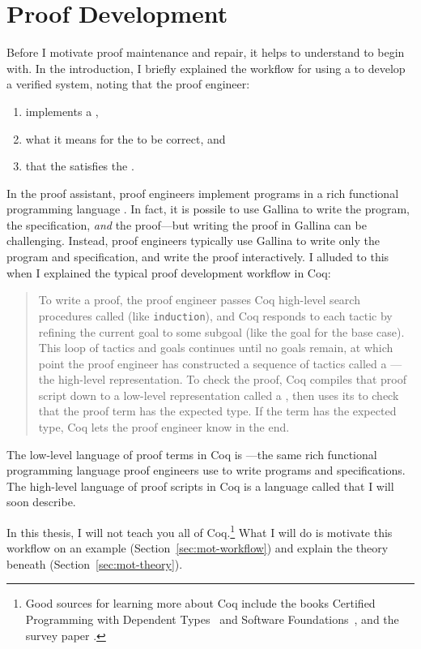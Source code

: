 \section{Proof Development}
\label{sec:mot-dev}

Before I motivate proof maintenance and repair, it helps to understand  to begin with.
In the introduction, I briefly explained the workflow for using a  to develop a verified system,
noting that the proof engineer:

\begin{enumerate}
\item implements a ,
\item {} what it means for the  to be correct, and
\item {} that the  satisfies the .
\end{enumerate}
In the  proof assistant, proof engineers implement programs in a rich functional programming language .
In fact, it is possile to use Gallina to write the program, the specification, \textit{and} the proof---but writing the proof in Gallina can be challenging.
Instead, proof engineers typically use Gallina to write only the program and specification,
and write the proof interactively.
I alluded to this when I explained the typical proof development workflow in Coq:

\begin{quote}
To write a proof, the proof engineer passes Coq high-level search procedures called  (like \lstinline{induction}), and Coq responds to each tactic
by refining the current goal to some subgoal (like the goal for the base case). This loop of tactics and goals 
continues until no goals remain, at which point the proof engineer has constructed a sequence of tactics called a ---the
high-level representation.
To check the proof, Coq compiles that proof script down to a low-level representation called a ,
then uses its  to check that the proof term has the expected type.
If the term has the expected type, Coq lets the proof engineer know in the end.
\end{quote}
The low-level language of proof terms in Coq is ---the same rich functional programming language proof engineers use to write programs and specifications.
The high-level language of proof scripts in Coq is a language called  that I will soon describe.

In this thesis, I will not teach you all of Coq.\footnote{Good sources 
for learning more about Coq include the books Certified Programming with Dependent Types~\cite{chlipala:cpdt}
and Software Foundations~\cite{software-foundations}, and the survey paper .}
What I will do is motivate this workflow on an example (Section~\ref{sec:mot-workflow})
and explain the theory beneath (Section~\ref{sec:mot-theory}).





